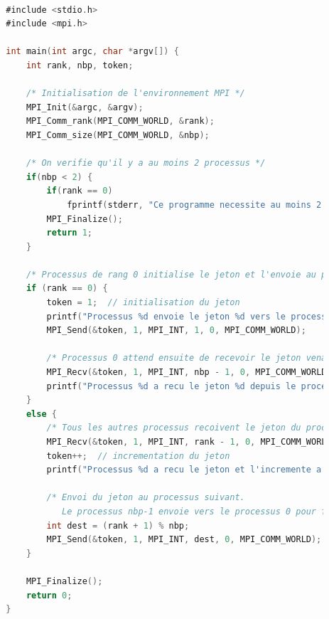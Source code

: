 \documentclass[a4paper,13pt]{book}
\begin{document}
	\begin{lstlisting}[language=C]

        #include <stdio.h>
        #include <mpi.h>
        
        int main(int argc, char *argv[]) {
            int rank, nbp, token;
        
            /* Initialisation de l'environnement MPI */
            MPI_Init(&argc, &argv);
            MPI_Comm_rank(MPI_COMM_WORLD, &rank);
            MPI_Comm_size(MPI_COMM_WORLD, &nbp);
        
            /* On verifie qu'il y a au moins 2 processus */
            if(nbp < 2) {
                if(rank == 0)
                    fprintf(stderr, "Ce programme necessite au moins 2 processus.\n");
                MPI_Finalize();
                return 1;
            }
        
            /* Processus de rang 0 initialise le jeton et l'envoie au processus de rang 1 */
            if (rank == 0) {
                token = 1;  // initialisation du jeton
                printf("Processus %d envoie le jeton %d vers le processus 1\n", rank, token);
                MPI_Send(&token, 1, MPI_INT, 1, 0, MPI_COMM_WORLD);
                
                /* Processus 0 attend ensuite de recevoir le jeton venant du dernier processus */
                MPI_Recv(&token, 1, MPI_INT, nbp - 1, 0, MPI_COMM_WORLD, MPI_STATUS_IGNORE);
                printf("Processus %d a recu le jeton %d depuis le processus %d\n", rank, token, nbp - 1);
            }
            else {
                /* Tous les autres processus recoivent le jeton du processus precedent */
                MPI_Recv(&token, 1, MPI_INT, rank - 1, 0, MPI_COMM_WORLD, MPI_STATUS_IGNORE);
                token++;  // incrementation du jeton
                printf("Processus %d a recu le jeton et l'incremente a %d\n", rank, token);
        
                /* Envoi du jeton au processus suivant.
                   Le processus nbp-1 envoie vers le processus 0 pour fermer l'anneau. */
                int dest = (rank + 1) % nbp;
                MPI_Send(&token, 1, MPI_INT, dest, 0, MPI_COMM_WORLD);
            }
        
            MPI_Finalize();
            return 0;
        }
        
\end{lstlisting}
\end{document}
